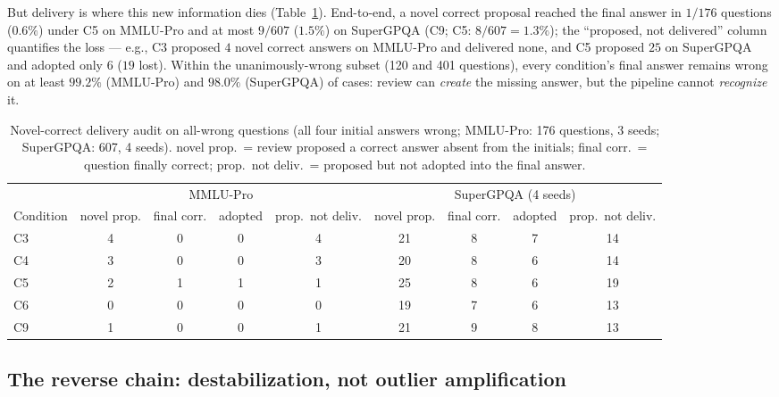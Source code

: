 \documentclass[11pt]{article}
\begin{document}
But delivery is where this new information dies (Table~\ref{tab:delivery}). End-to-end, a novel correct proposal reached the final answer in $1/176$ questions ($0.6\%$) under C5 on MMLU-Pro and at most $9/607$ ($1.5\%$) on SuperGPQA (C9; C5: $8/607 = 1.3\%$); the ``proposed, not delivered'' column quantifies the loss --- e.g., C3 proposed $4$ novel correct answers on MMLU-Pro and delivered none, and C5 proposed $25$ on SuperGPQA and adopted only $6$ ($19$ lost). Within the unanimously-wrong subset (120 and 401 questions), every condition's final answer remains wrong on at least $99.2\%$ (MMLU-Pro) and $98.0\%$ (SuperGPQA) of cases: review can \emph{create} the missing answer, but the pipeline cannot \emph{recognize} it.

\begin{table}[t]
\centering
\small
\caption{Novel-correct delivery audit on all-wrong questions (all four initial answers wrong; MMLU-Pro: 176 questions, 3 seeds; SuperGPQA: 607, 4 seeds). novel prop.\ = review proposed a correct answer absent from the initials; final corr.\ = question finally correct; prop.\ not deliv.\ = proposed but not adopted into the final answer.}
\label{tab:delivery}
\begin{tabular}{lcccccccc}
\toprule
 & \multicolumn{4}{c}{MMLU-Pro} & \multicolumn{4}{c}{SuperGPQA (4 seeds)} \\
\cmidrule(lr){2-5}\cmidrule(lr){6-9}
Condition & novel prop. & final corr. & adopted & prop.\ not deliv. & novel prop. & final corr. & adopted & prop.\ not deliv. \\
\midrule
C3 & 4 & 0 & 0 & 4 & 21 & 8 & 7 & 14 \\
C4 & 3 & 0 & 0 & 3 & 20 & 8 & 6 & 14 \\
C5 & 2 & 1 & 1 & 1 & 25 & 8 & 6 & 19 \\
C6 & 0 & 0 & 0 & 0 & 19 & 7 & 6 & 13 \\
C9 & 1 & 0 & 0 & 1 & 21 & 9 & 8 & 13 \\
\bottomrule
\end{tabular}
\end{table}

\subsection{The reverse chain: destabilization, not outlier amplification}
\label{sec:rev}
\end{document}

